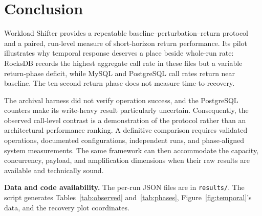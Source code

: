 \documentclass[10pt]{article}
\begin{document}
\section{Conclusion}
Workload Shifter provides a repeatable baseline--perturbation--return protocol and a paired, run-level measure of short-horizon return performance. Its pilot illustrates why temporal response deserves a place beside whole-run rate: RocksDB records the highest aggregate call rate in these files but a variable return-phase deficit, while MySQL and PostgreSQL call rates return near baseline. The ten-second return phase does not measure time-to-recovery.

The archival harness did not verify operation success, and the PostgreSQL counters make its write-heavy result particularly uncertain. Consequently, the observed call-level contrast is a demonstration of the protocol rather than an architectural performance ranking. A definitive comparison requires validated operations, documented configurations, independent runs, and phase-aligned system measurements. The same framework can then accommodate the capacity, concurrency, payload, and amplification dimensions when their raw results are available and technically sound.

\noindent\textbf{Data and code availability.} The per-run JSON files are in \texttt{results/}. The script  generates Tables~\ref{tab:observed} and~\ref{tab:phases}, Figure~\ref{fig:temporal}'s data, and the recovery plot coordinates.
\end{document}
